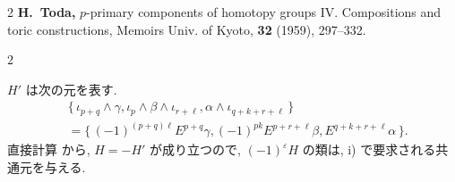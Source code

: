 \documentclass[10pt, leqno]{ltjsarticle}
\newcommand{\toda}[1]{\{\,#1\,\}}              %
\numberwithin{equation}{section}
\theoremstyle{plain}
\theoremstyle{definition}
\theoremstyle{remark}
\begin{document}
\begin{paracol}{2}
\noindent
\textbf{
\cite{Toda1959}
H.~Toda,}
\newblock $p$-primary components of homotopy groups IV. Compositions and toric constructions,
\newblock Memoirs Univ. of Kyoto, {\bf 32} (1959), 297--332.



\end{paracol}

\begin{paracol}{2}

\noindent
\(H'\) は次の元を表す.
\[
\begin{align*}
& \toda{\iota_{p+q}\wedge \gamma, 
\iota_p\wedge \beta\wedge \iota_{r+\ell}, 
\alpha\wedge\iota_{q+k+r+\ell}}\\
& =\toda{(-1)^{(p+q)\ell}E^{p+q}\gamma, 
(-1)^{pk}E^{p+r+\ell}\beta, 
E^{q+k+r+\ell}\alpha} .
\end{align*}
\]
直接計算
から, \(H=-H'\) が成り立つので, 
\((-1)^\varepsilon H\) の類は, i) で要求される共通元を与える. 



\end{paracol}
\end{document}
